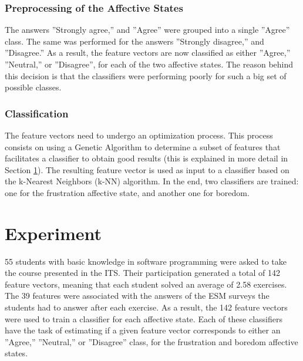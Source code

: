\documentclass[runningheads,a4paper]{llncs}
\begin{document}

\subsubsection{Preprocessing of the Affective States}

The answers ''Strongly agree,'' and ''Agree'' were grouped into a single ''Agree'' class. The same was performed for the answers ''Strongly disagree,'' and ''Disagree.'' As a result, the feature vectors are now classified as either ''Agree,'' ''Neutral,'' or ''Disagree'', for each of the two affective states. The reason behind this decision is that the classifiers were performing poorly for such a big set of possible classes.

\subsubsection{Classification}

The feature vectors need to undergo an optimization process. This process consists on using a Genetic Algorithm to determine a subset of features that facilitates a classifier to obtain good results (this is explained in more detail in Section \ref{experiment}). The resulting feature vector is used as input to a classifier based on the k-Nearest Neighbors (k-NN) algorithm. In the end, two classifiers are trained: one for the frustration affective state, and another one for boredom.

\section{Experiment}
\label{experiment}

55 students with basic knowledge in software programming were asked to take the course presented in the ITS. Their participation generated a total of 142 feature vectors, meaning that each student solved an average of 2.58 exercises. The 39 features were associated with the answers of the ESM surveys the students had to answer after each exercise. As a result, the 142 feature vectors were used to train a classifier for each affective state. Each of these classifiers have the task of estimating if a given feature vector corresponds to either an ''Agree,'' ''Neutral,'' or ''Disagree'' class, for the frustration and boredom affective states.
\end{document}
